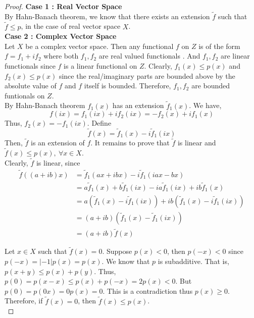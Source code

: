 \begin{proof}
	\textbf{Case 1 : Real Vector Space}\\
	By Hahn-Banach theorem, we know that there exists an extension $\tilde{f}$ such that $\tilde{f} \le p$, in the case of real vector space $X$.\\

	\textbf{Case 2 : Complex Vector Space}\\
	Let $X$ be a complex vector space.
	Then any functional $f$ on $Z$ is of the form $f = f_1 + if_2$ where both $f_1,f_2$ are real valued functionals .
	And $f_1,f_2$ are linear functionals since $f$ is a linear functional on {\color{red}$Z$}.
	{\color{blue}
	Clearly, $f_1(x) \le p(x)$ and $f_2(x) \le p(x)$ since the real/imaginary parts are bounded above by the absolute value of $f$ and $f$ itself is bounded.
	Therefore, $f_1,f_2$ are bounded funtionals on $Z$.}\\

	By Hahn-Banach theorem $f_1(x)$ has an extension $\tilde{f}_1(x)$.
	We have,	
	\[ f(ix) = f_1(ix)+if_2(ix) = -f_2(x)+if_1(x) \]
	Thus, $f_2(x) = -f_1(ix)$.
	Define
	\[ \tilde{f}(x) = \tilde{f}_1(x) - i \tilde{f}_1(ix) \]
	Then, $\tilde{f}$ is an extension of $f$.
	It remains to prove that $\tilde{f}$ is linear and $\tilde{f}(x) \le p(x),\ \forall x \in X$.\\

	Clearly, $\tilde{f}$ is linear, since
	\begin{align*}
		\tilde{f}((a+ib)x) 
		& = \tilde{f}_1(ax+ibx) - i\tilde{f}_1(iax-bx)\\
		& = a\tilde{f}_1(x) + b\tilde{f}_1(ix) - ia\tilde{f}_1(ix) + ib \tilde{f}_1(x) \\
		& = a \left(\tilde{f}_1(x)-i\tilde{f}_1(ix) \right) + ib \left(\tilde{f}_1(x)-i\tilde{f}_1(ix) \right) \\
		& = (a+ib) \left(\tilde{f}_1(x) - \tilde{f}_1(ix) \right) \\
		& = (a+ib)\tilde{f}(x)
	\end{align*}

	Let $x \in X$ such that $\tilde{f}(x) = 0$.
	Suppose $p(x) < 0$, then $p(-x) < 0$ since $p(-x) = |-1|p(x) = p(x)$.
	We know that $p$ is subadditive.
	That is, $p(x+y) \le p(x)+p(y)$.
	Thus, $p(0) = p(x-x) \le p(x) + p(-x) = 2p(x) < 0$.
	{\color{red}
	But $p(0) = p(0x) = 0p(x) = 0$.}
	This is a contradiction thus $p(x) \ge 0$.
	Therefore, if $\tilde{f}(x) = 0$, then $\tilde{f}(x) \le p(x)$.\\


\end{proof}

